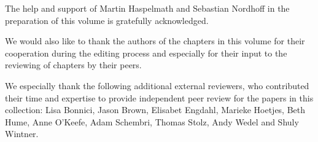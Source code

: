 The help and support of Martin Haspelmath and Sebastian Nordhoff in the preparation of this volume is gratefully acknowledged. 

We would also like to thank the authors of the chapters in this volume for their cooperation during the editing process and especially for their input to the reviewing of chapters by their peers. 

We especially thank the following additional external reviewers, %
who contributed their time and expertise to provide independent peer review for the papers in this collection: Lisa Bonnici, Jason Brown, Elisabet Engdahl, Marieke Hoetjes, Beth Hume, Anne O'Keefe, Adam Schembri, Thomas Stolz, Andy Wedel and Shuly Wintner.
 
